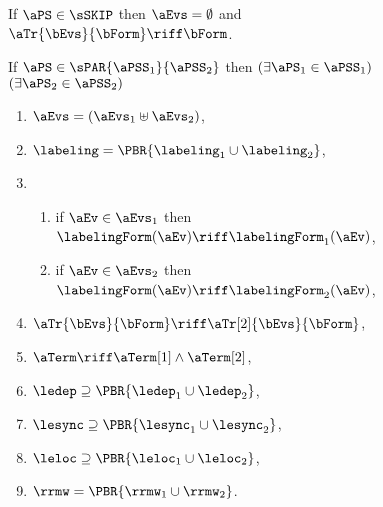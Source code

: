 \begin{figure}
  \raggedright
  \noindent
  If $\aPS\in\sSKIP$ then $\aEvs = \emptyset$ and
  $\aTr{\bEvs}{\bForm} \riff \bForm$.
  \medskip

  \noindent
  If $\aPS \in \sPAR{\aPSS_1}{\aPSS_2}$ then  
  $(\exists\aPS_1\in\aPSS_1)$ $(\exists\aPS_2\in\aPSS_2)$
  \begin{multicols}{2}
    \begin{enumerate}[topsep=0pt,label=(\textsc{p}\arabic*),ref=\textsc{p}\arabic*]
    \item \label{par-E}
      $\aEvs = (\aEvs_1\uplus\aEvs_2)$,
    \item \label{par-lambda}
      ${\labeling}=\PBR{{\labeling_1}\cup {\labeling_2}}$, 
    \item[] \setcounter{enumi}{\value{kappa}} 
      \begin{enumerate}[leftmargin=0pt]
      \item \label{par-kappa1} if $\aEv\in\aEvs_1$ then $\labelingForm(\aEv) \riff \labelingForm_1(\aEv)$,
      \item \label{par-kappa2} if $\aEv\in\aEvs_2$ then $\labelingForm(\aEv) \riff \labelingForm_2(\aEv)$,
      \end{enumerate}
    \item \label{par-tau}
      $\aTr{\bEvs}{\bForm} \riff \aTr[2]{\bEvs}{\bForm}$,
    \item \label{par-term}
      $\aTerm \riff \aTerm[1]\land\aTerm[2]$,
    \item \label{par-ledep}
      ${\ledep}\supseteq\PBR{{\ledep_1}\cup{\ledep_2}}$, 
    \item \label{par-lesync}
      ${\lesync}\supseteq\PBR{{\lesync_1}\cup{\lesync_2}}$, 
    \item \label{par-leloc}
      ${\leloc}\supseteq\PBR{{\leloc_1}\cup{\leloc_2}}$, 
    \item \label{par-rmw}
      ${\rrmw}=\PBR{{\rrmw_1}\cup{\rrmw_2}}$.
    \end{enumerate}    
  \end{multicols}
  \medskip


\end{figure}
